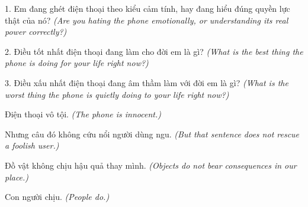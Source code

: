 \begin{tuhocnhanh}
1. Em đang ghét điện thoại theo kiểu cảm tính, hay đang hiểu đúng quyền lực thật của nó? \textit{(Are you hating the phone emotionally, or understanding its real power correctly?)}

2. Điều tốt nhất điện thoại đang làm cho đời em là gì? \textit{(What is the best thing the phone is doing for your life right now?)}

3. Điều xấu nhất điện thoại đang âm thầm làm với đời em là gì? \textit{(What is the worst thing the phone is quietly doing to your life right now?)}
\end{tuhocnhanh}

\begin{tongketchuong}
Điện thoại vô tội.
\textit{(The phone is innocent.)}

Nhưng câu đó không cứu nổi người dùng ngu.
\textit{(But that sentence does not rescue a foolish user.)}

Đồ vật không chịu hậu quả thay mình.
\textit{(Objects do not bear consequences in our place.)}

Con người chịu.
\textit{(People do.)}
\end{tongketchuong}

\ngancach